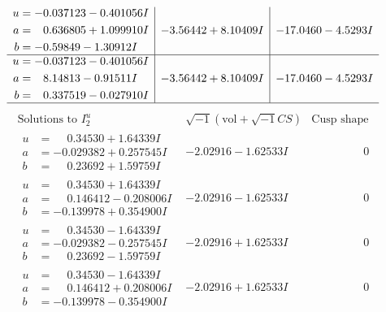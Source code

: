 \documentclass[1p]{elsarticle_modified}
\theoremstyle{definition}
\newcommand{\I}{\sqrt{-1}}
\begin{document}
$$\begin{array}{c|c|c}
\begin{aligned}
u &= -0.037123 - 0.401056 I \\
a &= \phantom{-}0.636805 + 1.099910 I \\
b &= -0.59849 - 1.30912 I\end{aligned}
 & -3.56442 + 8.10409 I & -17.0460 - 4.5293 I \\ \hline\begin{aligned}
u &= -0.037123 - 0.401056 I \\
a &= \phantom{-}8.14813 - 0.91511 I \\
b &= \phantom{-}0.337519 - 0.027910 I\end{aligned}
 & -3.56442 + 8.10409 I & -17.0460 - 4.5293 I\\
 \hline 
 \end{array}$$\newpage$$\begin{array}{c|c|c}  
\text{Solutions to }I^u_{2}& \I (\text{vol} + \sqrt{-1}CS) & \text{Cusp shape}\\
 \hline 
\begin{aligned}
u &= \phantom{-}0.34530 + 1.64339 I \\
a &= -0.029382 + 0.257545 I \\
b &= \phantom{-}0.23692 + 1.59759 I\end{aligned}
 & -2.02916 - 1.62533 I & \phantom{-0.000000 } 0 \\ \hline\begin{aligned}
u &= \phantom{-}0.34530 + 1.64339 I \\
a &= \phantom{-}0.146412 - 0.208006 I \\
b &= -0.139978 + 0.354900 I\end{aligned}
 & -2.02916 - 1.62533 I & \phantom{-0.000000 } 0 \\ \hline\begin{aligned}
u &= \phantom{-}0.34530 - 1.64339 I \\
a &= -0.029382 - 0.257545 I \\
b &= \phantom{-}0.23692 - 1.59759 I\end{aligned}
 & -2.02916 + 1.62533 I & \phantom{-0.000000 } 0 \\ \hline\begin{aligned}
u &= \phantom{-}0.34530 - 1.64339 I \\
a &= \phantom{-}0.146412 + 0.208006 I \\
b &= -0.139978 - 0.354900 I\end{aligned}
 & -2.02916 + 1.62533 I & \phantom{-0.000000 } 0 \\ \hline\begin{aligned}

\end{aligned}
\end{array}$$
\end{document}
